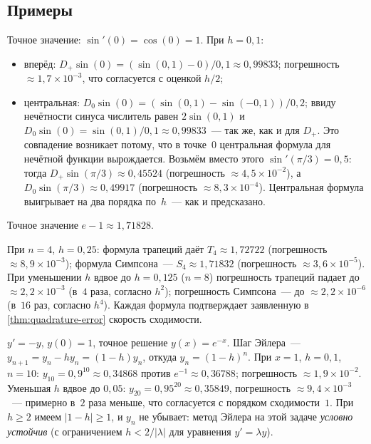 \subsection*{Примеры}

\begin{example}
\label{ex:diff-sin}
Точное значение: $\sin'(0) = \cos(0) = 1$. При $h = 0{,}1$:
\begin{itemize}
  \item вперёд: $D_+ \sin(0) = (\sin(0{,}1) - 0)/0{,}1 \approx 0{,}99833$;
        погрешность $\approx 1{,}7 \times 10^{-3}$, что согласуется с
        оценкой $h/2$;
  \item центральная: $D_0 \sin(0) = (\sin(0{,}1) - \sin(-0{,}1))/0{,}2$;
        ввиду нечётности синуса числитель равен $2 \sin(0{,}1)$ и
        $D_0 \sin(0) = \sin(0{,}1)/0{,}1 \approx 0{,}99833$~--- так же,
        как и для $D_+$. Это совпадение возникает потому, что в
        точке~$0$ центральная формула для нечётной функции вырождается.
        Возьмём вместо этого $\sin'(\pi/3) = 0{,}5$: тогда
        $D_+ \sin(\pi/3) \approx 0{,}45524$ (погрешность
        $\approx 4{,}5 \times 10^{-2}$), а
        $D_0 \sin(\pi/3) \approx 0{,}49917$ (погрешность
        $\approx 8{,}3 \times 10^{-4}$). Центральная формула выигрывает
        на два порядка по~$h$~--- как и предсказано.
\end{itemize}
\end{example}

\begin{example}
\label{ex:quadrature-exp}
Точное значение $e - 1 \approx 1{,}71828$.

При $n = 4$, $h = 0{,}25$: формула трапеций даёт
$T_4 \approx 1{,}72722$ (погрешность $\approx 8{,}9 \times 10^{-3}$);
формула Симпсона~--- $S_4 \approx 1{,}71832$ (погрешность
$\approx 3{,}6 \times 10^{-5}$). При уменьшении $h$ вдвое до $h = 0{,}125$
($n = 8$) погрешность трапеций падает до $\approx 2{,}2 \times 10^{-3}$
(в~$4$ раза, согласно $h^2$); погрешность Симпсона~--- до
$\approx 2{,}2 \times 10^{-6}$ (в~$16$ раз, согласно $h^4$). Каждая
формула подтверждает заявленную в \cref{thm:quadrature-error}
скорость сходимости.
\end{example}

\begin{example}[Метод Эйлера для модельной задачи $y' = -y$]
\label{ex:euler-model}
$y' = -y$, $y(0) = 1$, точное решение $y(x) = e^{-x}$. Шаг Эйлера~---
$y_{n+1} = y_n - h y_n = (1 - h) y_n$, откуда $y_n = (1 - h)^n$. При
$x = 1$, $h = 0{,}1$, $n = 10$: $y_{10} = 0{,}9^{10} \approx 0{,}34868$
против $e^{-1} \approx 0{,}36788$; погрешность
$\approx 1{,}9 \times 10^{-2}$. Уменьшая $h$ вдвое до $0{,}05$:
$y_{20} = 0{,}95^{20} \approx 0{,}35849$, погрешность
$\approx 9{,}4 \times 10^{-3}$~--- примерно в~$2$ раза меньше, что
согласуется с порядком сходимости~$1$. При $h \geq 2$ имеем
$|1 - h| \geq 1$, и $y_n$ не убывает: метод Эйлера на этой задаче
\emph{условно устойчив} (с ограничением $h < 2/|\lambda|$ для
уравнения $y' = \lambda y$).
\end{example}


